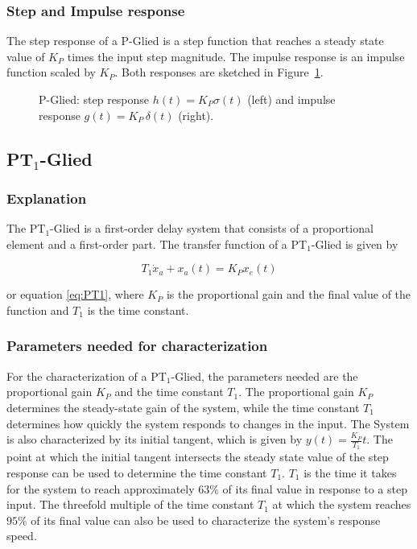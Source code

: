 \documentclass[12pt, oneside, a4paper]{scrreprt}
\begin{document}
                \subsubsection{Step and Impulse response}
                    The step response of a P-Glied is a step function that reaches a steady state value of $K_P$ times the input step magnitude. The impulse response is an impulse function scaled by $K_P$. Both responses are sketched in Figure~\ref{fig:P-Glied-responses}.

                    \begin{figure}[ht]
                        \centering
                        
                        \caption{P-Glied: step response $h(t) = K_P \sigma(t)$ (left) and impulse response $g(t) = K_P\,\delta(t)$ (right).}
                        \label{fig:P-Glied-responses}
                    \end{figure}

            \cleardoublepage

            \subsection{PT$_1$-Glied}

                \subsubsection{Explanation}
                    The PT$_1$-Glied is a first-order delay system that consists of a proportional element and a first-order part. The transfer function of a PT$_1$-Glied is given by 
                    
                    \begin{equation}
                        T_1 \dot{x}_a + x_a(t) = K_P x_e(t)
                    \end{equation}

                    or equation \ref{eq:PT1}, where $K_P$ is the proportional gain and the final value of the function and $T_1$ is the time constant. 
                
                \subsubsection{Parameters needed for characterization}
                    For the characterization of a PT$_1$-Glied, the parameters needed are the proportional gain $K_P$ and the time constant $T_1$. The proportional gain $K_P$ determines the steady-state gain of the system, while the time constant $T_1$ determines how quickly the system responds to changes in the input.
                    The System is also characterized by its initial tangent, which is given by $y(t) = \frac{K_P}{T_1} t$. The point at which the initial tangent intersects the steady state value of the step response can be used to determine the time constant $T_1$. $T_1$ is the time it takes for the system to reach approximately $63\%$ of its final value in response to a step input. The threefold multiple of the time constant $T_1$ at which the system reaches $95\%$ of its final value can also be used to characterize the system's response speed. 
\end{document}

